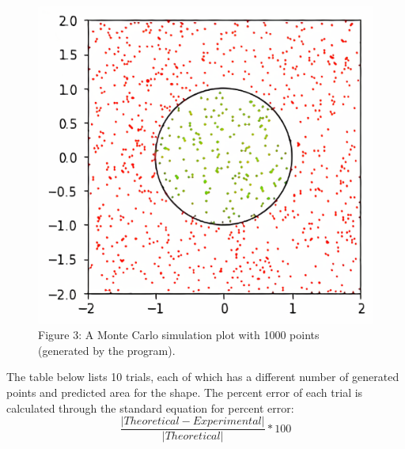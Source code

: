 \documentclass[11pt]{article}
\begin{document}


\begin{figure}[h]
\includegraphics[scale=.19]{circle_populated}
\centering\\
\footnotesize\centering Figure 3: A Monte Carlo simulation plot with 1000 points (generated by the program).
\end{figure} 

\raggedright

\newpage
The table below lists 10 trials, each of which has a different number of generated points and predicted area for the shape. The percent error of each trial is calculated through the standard equation for percent error:\\[-3ex]

\[\frac{|Theoretical-Experimental|}{|Theoretical|}*100\]

 
\end{document}
